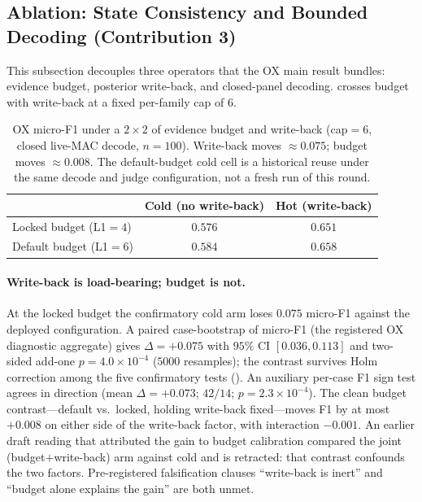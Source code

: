\subsection{Ablation: State Consistency and Bounded Decoding (Contribution 3)}
\label{sec:res-state}

This subsection decouples three operators that the OX main result bundles: evidence budget, posterior write-back, and closed-panel decoding.
 crosses budget with write-back at a fixed per-family cap of $6$.

\begin{table}[t]
\centering
\small
\caption{OX micro-F1 under a $2{\times}2$ of evidence budget and write-back (cap${=}6$, closed live-MAC decode, $n{=}100$). Write-back moves ${\approx}0.075$; budget moves ${\approx}0.008$. The default-budget cold cell is a historical reuse under the same decode and judge configuration, not a fresh run of this round.}
\label{tab:state-2x2}
\begin{tabular}{lcc}
\toprule
 & Cold (no write-back) & Hot (write-back) \\
\midrule
Locked budget (L1${=}4$) & $0.576$ & $\mathbf{0.651}$ \\
Default budget (L1${=}6$) & $0.584$ & $0.658$ \\
\bottomrule
\end{tabular}
\end{table}

\paragraph{Write-back is load-bearing; budget is not.}
At the locked budget the confirmatory cold arm loses $0.075$ micro-F1 against the deployed configuration.
A paired case-bootstrap of micro-F1 (the registered OX diagnostic aggregate) gives $\Delta{=}{+}0.075$ with $95\%$ CI $[0.036,0.113]$ and two-sided add-one $p{=}4.0{\times}10^{-4}$ ($5000$ resamples); the contrast survives Holm correction among the five confirmatory tests ().
An auxiliary per-case F1 sign test agrees in direction (mean $\Delta{=}{+}0.073$; $42/14$; $p{=}2.3{\times}10^{-4}$).
The clean budget contrast---default vs.\ locked, holding write-back fixed---moves F1 by at most ${+}0.008$ on either side of the write-back factor, with interaction $-0.001$.
An earlier draft reading that attributed the gain to budget calibration compared the joint (budget${+}$write-back) arm against cold and is retracted: that contrast confounds the two factors.
Pre-registered falsification clauses ``write-back is inert'' and ``budget alone explains the gain'' are both unmet.

